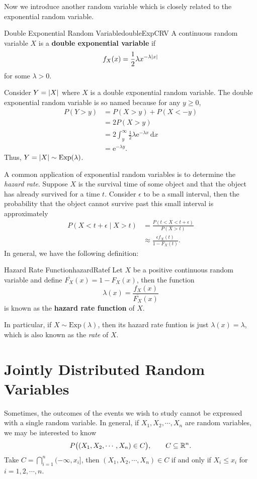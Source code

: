 \documentclass[math]{amznotes}
\theoremstyle{remark}
\begin{document}
Now we introduce another random variable which is closely related to the exponential random variable.
\begin{dfnbox}{Double Exponential Random Variable}{doubleExpCRV}
    A continuous random variable $X$ is a {\color{red} \textbf{double exponential variable}} if 
    \begin{equation*}
        f_X(x) = \frac{1}{2}\lambda x^{-\lambda{\left\lvert {x} \right\rvert}}
    \end{equation*}
    for some $\lambda > 0$.
\end{dfnbox}
Consider $Y = {\left\lvert {X} \right\rvert}$ where $X$ is a double exponential random variable. The double exponential random variable is so named because for any $y \geq 0$,
\begin{align*}
    P(Y > y) & = P(X > y) + P(X < -y) \\
    & = 2P(X > y) \\
    & = 2\int_{y}^{\infty}\!\frac{1}{2}\lambda \mathrm{e}^{-\lambda x}\,\mathrm{d}x \\
    & = \mathrm{e}^{-\lambda y}.
\end{align*}
Thus, $Y = {\left\lvert {X} \right\rvert} \sim \mathrm{Exp}(\lambda)$.

A common application of exponential random variables is to determine the \textit{hazard rate}. Suppose $X$ is the survival time of some object and that the object has already survived for a time $t$. Consider $\epsilon$ to be a small interval, then the probability that the object cannot survive past this small interval is approximately
\begin{align*}
    P(X < t + \epsilon \mid X > t) & = \frac{P(t < X < t + \epsilon)}{P(X > t)} \\
    & \approx \frac{\epsilon f_X(t)}{1 - F_X(t)}.
\end{align*}
In general, we have the following definition:
\begin{dfnbox}{Hazard Rate Function}{hazardRatef}
    Let $X$ be a positive continuous random variable and define $\overline{F_X}(x) = 1 - F_X(x)$, then the function
    \begin{equation*}
        \lambda(x) = \frac{f_X(x)}{\overline{F_X}(x)}
    \end{equation*}
    is known as the {\color{red} \textbf{hazard rate function}} of $X$.
\end{dfnbox}
In particular, if $X \sim \mathrm{Exp}(\lambda)$, then its hazard rate funtion is just $\lambda(x) = \lambda$, which is also known as the \textit{rate} of $X$.

\section{Jointly Distributed Random Variables}
Sometimes, the outcomes of the events we wish to study cannot be expressed with a single random variable. In general, if $X_1, X_2, \cdots, X_n$ are random variables, we may be interested to know
\begin{equation*}
    P\bigl((X_1, X_2, \cdots, X_n) \in C\bigr), \qquad C \subseteq \mathbb{R}^n.
\end{equation*}
Take $C = \bigcap_{i = 1}^{n}(-\infty, x_i]$, then $(X_1, X_2, \cdots, X_n) \in C$ if and only if $X_i \leq x_i$ for $i = 1, 2, \cdots, n$.
\end{document}
